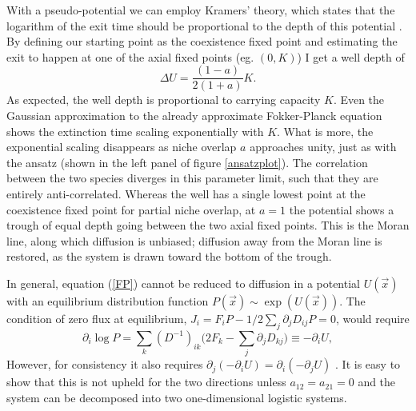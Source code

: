 With a pseudo-potential we can employ Kramers' theory, which states that the logarithm of the exit time should be proportional to the depth of this potential \cite{Hanggi1990}. 
By defining our starting point as the coexistence fixed point and estimating the exit to happen at one of the axial fixed points (eg. $(0,K)$) I get a well depth of
\begin{equation}
\Delta U = \frac{(1-a)}{2(1+a)}K. 
\end{equation}
As expected, the well depth is proportional to carrying capacity $K$. 
Even the Gaussian approximation to the already approximate Fokker-Planck equation shows the extinction time scaling exponentially with $K$. 
What is more, the exponential scaling disappears as niche overlap $a$ approaches unity, just as with the ansatz (shown in the left panel of figure \ref{ansatzplot}). 
The correlation between the two species diverges in this parameter limit, such that they are entirely anti-correlated. 
Whereas the well has a single lowest point at the coexistence fixed point for partial niche overlap, at $a=1$ the potential shows a trough of equal depth going between the two axial fixed points. 
This is the Moran line, along which diffusion is unbiased; diffusion away from the Moran line is restored, as the system is drawn toward the bottom of the trough. 

\fi%

In general, equation (\ref{FP}) cannot be reduced to diffusion in a potential $U(\vec{x})$ with an equilibrium distribution function $P(\vec{x})\sim \exp(U(\vec{x}))$. The condition of zero flux at equilibrium, $J_i=F_iP - 1/2 \sum_{j}\partial_j D_{ij}P=0$, would require \cite{Gardiner2004}
\begin{equation*}
\partial_i \log P = \sum_k (D^{-1})_{ik} \big( 2 F_k - \sum_j \partial_j D_{kj} \big) \equiv - \partial_i U,
\end{equation*}
However, for consistency it also requires $\partial_j \left( - \partial_i U \right) = \partial_i \left( - \partial_j U \right)$ \cite{Gardiner2004}. 
It is easy to show that this is not upheld for the two directions unless $a_{12}=a_{21}=0$ and the system can be decomposed into two one-dimensional logistic systems.

